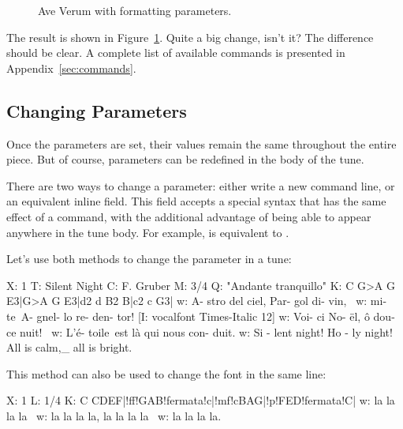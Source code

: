 \documentclass[a4paper,fullpage,12pt]{book}
\begin{document}
\begin{center}
\begin{figure}[htbp]
\caption{Ave Verum with formatting parameters.}
\label{fig:aveverum}
\end{figure}
\end{center}

The result is shown in Figure~\ref{fig:aveverum}. Quite a big change,
isn't it? The difference should be clear. A complete list of available
commands is presented in Appendix~\ref{sec:commands}.


\subsection{Changing Parameters}
\label{sec:changepar}

Once the parameters are set, their values remain the same throughout
the entire piece. But of course, parameters can be redefined in the
body of the tune.

There are two ways to change a parameter: either write a new command
line, or an equivalent  inline field. This field accepts a
special syntax that has the same effect of a command, with the
additional advantage of being able to appear anywhere in the tune
body. For example,  is equivalent to
.

Let's use both methods to change the  parameter in a
tune:

\begin{abcsource}
X: 1
T: Silent Night
C: F. Gruber
M: 3/4
Q: "Andante tranquillo"
K: C
%
G>A G E3|G>A G E3|d2 d B2 B|c2 c G3|
w: A- stro del ciel, Par- gol di- vin, \
w: mi- te~A- gnel- lo re- den- tor!
[I: vocalfont Times-Italic 12]
w: Voi- ci No- \"el, \^o dou- ce nuit! \
w: L'\'e- toile~est l\`a qui nous con- duit.
w: Si - lent night! Ho - ly night! All is calm,_ all is bright.
\end{abcsource}


This method can also be used to change the font in the same line:

\begin{abcsource}
X: 1
L: 1/4
K: C
CDEF|!ff!GAB!fermata!c|!mf!cBAG|!p!FED!fermata!C|
w: la la la la\
w: la la la la, la la la la\
w: la la la la.
\end{abcsource}
\end{document}
